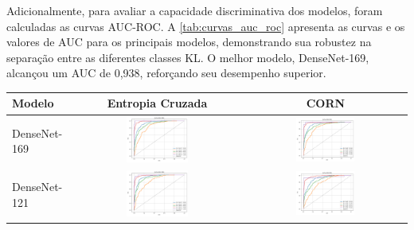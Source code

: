 Adicionalmente, para avaliar a capacidade discriminativa dos modelos, foram calculadas as curvas AUC-ROC. A \autoref{tab:curvas_auc_roc} apresenta as curvas e os valores de AUC para os principais modelos, demonstrando sua robustez na separação entre as diferentes classes KL. O melhor modelo, DenseNet-169, alcançou um AUC de 0,938, reforçando seu desempenho superior.

\begin{table}[!htbp]
    \centering
    \begin{tabular}{|l|c|c|}
        \hline
        \textbf{Modelo} & \textbf{Entropia Cruzada} & \textbf{CORN} \\ \hline
        DenseNet-169 & \includegraphics[width=0.38\textwidth]{figs/auc_roc/densenet169_auc_roc_cross_entropy.png} & \includegraphics[width=0.38\textwidth]{figs/auc_roc/densenet169_auc_roc_corn.png} \\ \hline
        DenseNet-121 & \includegraphics[width=0.38\textwidth]{figs/auc_roc/densenet121_auc_roc_cross_entropy.png} & \includegraphics[width=0.38\textwidth]{figs/auc_roc/densenet121_auc_roc_corn.png} \\ \hline

\end{tabular}
\end{table}
